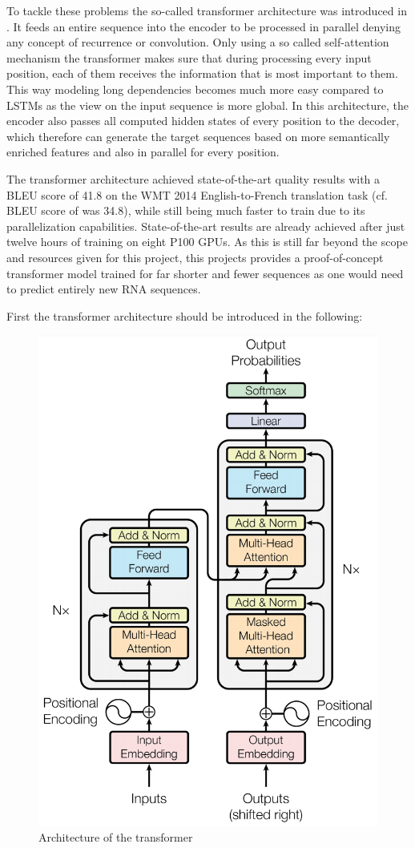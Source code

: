 To tackle these problems the so-called transformer architecture was introduced in \cite{Vaswani2017}. It feeds an entire sequence into the encoder to be processed in parallel denying any concept of recurrence or convolution. Only using a so called self-attention mechanism the transformer makes sure that during processing every input position, each of them receives the information that is most important to them. This way modeling long dependencies becomes much more easy compared to \acp{LSTM} as the view on the input sequence is more global. In this architecture, the encoder also passes all computed hidden states of every position to the decoder, which therefore \cite{Vaswani2017} can generate the target sequences based on more semantically enriched features and also in parallel for every position. \cite{Vaswani2017}

The transformer architecture achieved state-of-the-art quality results with a BLEU score of 41.8 on the WMT 2014 English-to-French translation task (cf. BLEU score of \cite{Sutskever2014} was 34.8), while still being much faster to train due to its parallelization capabilities. State-of-the-art results are already achieved after just twelve hours of training on eight P100 \acp{GPU}. As this is still far beyond the scope and resources given for this project, this projects provides a proof-of-concept transformer model trained for far shorter and fewer sequences as one would need to predict entirely new \ac{RNA} sequences. \cite{Vaswani2017}

First the transformer architecture should be introduced in the following:

\begin{figure}[ht]
	\centering
	\includegraphics[width=0.5\linewidth]{figures/transformer.png}
	\caption{Architecture of the transformer \cite{Vaswani2017}}
	\label{transformer}
\end{figure}


